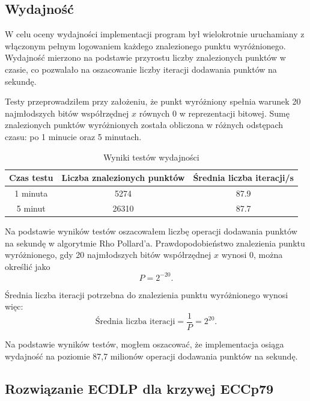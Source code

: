 \subsection{Wydajność}

W celu oceny wydajności implementacji program był wielokrotnie uruchamiany z
włączonym pełnym logowaniem każdego znalezionego punktu wyróżnionego. Wydajność
mierzono na podstawie przyrostu liczby znalezionych punktów w czasie, co pozwalało
na oszacowanie liczby iteracji dodawania punktów na sekundę.

Testy przeprowadziłem przy założeniu, że punkt wyróżniony spełnia warunek 20
najmłodszych bitów współrzędnej $x$ równych $0$ w reprezentacji bitowej.
Sumę znalezionych punktów wyróżnionych została obliczona w różnych odstępach czasu:
po 1 minucie oraz 5 minutach.

\begin{table}[h!]
    \centering
    \caption{Wyniki testów wydajności}
    \begin{tabular}{|c|c|c|}
        \hline
        \textbf{Czas testu} & \textbf{Liczba znalezionych punktów} &
        \textbf{Średnia liczba iteracji/s}                                \\ \hline
        1 minuta            & 5274                                 & 87.9 \\ \hline
        5 minut             & 26310                                & 87.7 \\ \hline
    \end{tabular}
    \label{tab:performance}
\end{table}

Na podstawie wyników testów oszacowałem liczbę operacji dodawania punktów na
sekundę w algorytmie Rho Pollard'a. Prawdopodobieństwo znalezienia punktu wyróżnionego,
gdy 20 najmłodszych bitów współrzędnej $x$ wynosi $0$, można określić jako
$$
    P = 2^{-20}.
$$

Średnia liczba iteracji potrzebna do znalezienia punktu wyróżnionego wynosi
więc:
$$
    \text{Średnia liczba iteracji} = \frac{1}{P} = 2^{20}.
$$

Na podstawie wyników testów, mogłem oszacować, że implementacja osiąga wydajność na
poziomie 87,7 milionów operacji dodawania punktów na sekundę.

\subsection{Rozwiązanie ECDLP dla krzywej ECCp79}

